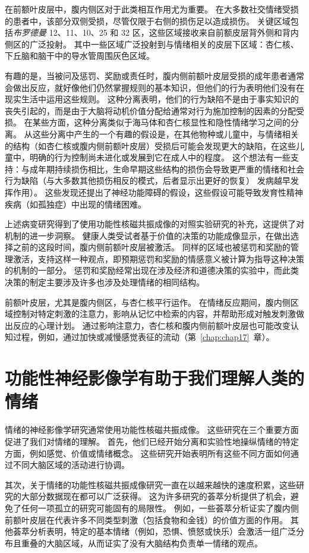 在前额叶皮层中，腹内侧区对于此类相互作用尤为重要。 在大多数社交情绪受损的患者中，该部分双侧受损，尽管仅限于右侧的损伤足以造成损伤。
关键区域包括\textit{布罗德曼} 12、11、10、25 和 32 区，这些区域接收来自前额皮层背外侧和背内侧区的广泛投射。
其中一些区域广泛投射到与情绪相关的皮层下区域：杏仁核、下丘脑和脑干中的导水管周围灰色区域。


有趣的是，当被问及惩罚、奖励或责任时，腹内侧前额叶皮层受损的成年患者通常会做出反应，就好像他们仍然掌握规则的基本知识，但他们的行为表明他们没有在现实生活中运用这些规则。
这种分离表明，他们的行为缺陷不是由于事实知识的丧失引起的，而是由于大脑将动机价值分配给通常对行为施加控制的因素的分配受损。
在某些方面，这种分离类似于海马体和杏仁核显性和隐性情绪学习之间的分离。
从这些分离中产生的一个有趣的假设是，在其他物种或儿童中，与情绪相关的结构（如杏仁核或腹内侧前额叶皮层）受损后可能会发现更大的缺陷，在这些儿童中，明确的行为控制尚未进化或发展到它在成人中的程度。
这个想法有一些支持：与成年期持续损伤相比，生命早期这些结构的损伤会导致更严重的情绪和社会行为缺陷（与大多数其他损伤相反的模式，后者显示出更好的恢复） 发病越早发挥作用）。
这些发现还提出了神经功能障碍的假设，这些假设可能导致发育性精神疾病（如孤独症）中出现的情绪困难。


上述病变研究得到了使用功能性核磁共振成像的对照实验研究的补充，这提供了对机制的进一步洞察。
健康人类受试者基于价值的决策的功能成像显示，在做出选择之前的这段时间，腹内侧前额叶皮层被激活。
同样的区域也被惩罚和奖励的管理激活，支持这样一种观点，即预期惩罚和奖励的情感意义被计算为指导这种决策的机制的一部分。
惩罚和奖励经常出现在涉及经济和道德决策的实验中，而此类决策的制定主要涉及许多也涉及处理情绪的相同结构。


前额叶皮层，尤其是腹内侧区，与杏仁核平行运作。
在情绪反应期间，腹内侧区域控制对特定刺激的注意力，影响从记忆中检索的内容，并帮助形成对触发刺激做出反应的心理计划。
通过影响注意力，杏仁核和腹内侧前额叶皮层也可能改变认知过程，例如，通过加快或减慢感觉表征的流动（第~\ref{chap:chap17}~章）。



\section{功能性神经影像学有助于我们理解人类的情绪}

情绪的神经影像学研究通常使用功能性核磁共振成像。
这些研究在三个重要方面促进了我们对情绪的理解。
首先，他们已经开始分离和实验性地操纵情绪的特定方面，例如感觉、价值或情绪概念。
这些研究开始表明所有这些不同方面如何通过不同大脑区域的活动进行协调。


其次，关于情绪的功能性核磁共振成像研究一直在以越来越快的速度积累，这些研究的大部分数据现在都可以广泛获得。
这为许多研究的荟萃分析提供了机会，避免了任何一项孤立的研究可能固有的局限性。
例如，一些荟萃分析证实了腹内侧前额叶皮层在代表许多不同类型刺激（包括食物和金钱）的价值方面的作用。
其他荟萃分析表明，特定的基本情绪（例如，恐惧、愤怒或快乐）会激活一组广泛分布且重叠的大脑区域，从而证实了没有大脑结构负责单一情绪的观点。


